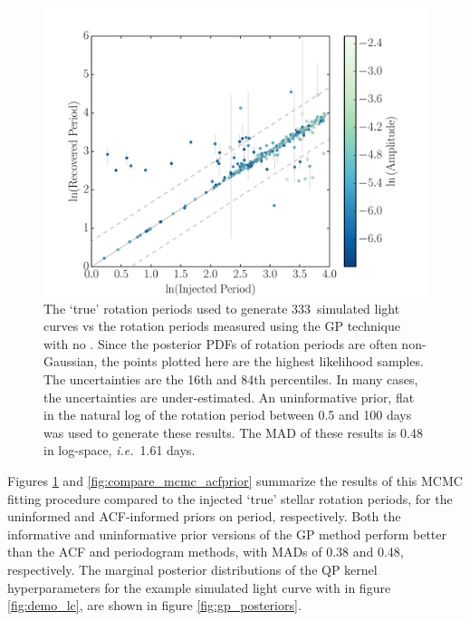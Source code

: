 \documentclass[useAMS, usenatbib, preprint, 12pt]{aastex}
\newcommand{\naigrain}{333}
\newcommand{\ie}{{\it i.e.}}
\begin{document}
\begin{figure}
\begin{center}
\includegraphics[width=6in, clip=true]{figures/comparison_noprior.pdf}
\caption{The `true' rotation periods used to generate \naigrain\
simulated light curves vs the rotation periods measured using the GP
technique with no .
Since the posterior PDFs of rotation periods are often non-Gaussian,
the points plotted here are the highest likelihood samples.
The uncertainties are the 16th and 84th percentiles.
In many cases, the uncertainties are under-estimated.
An uninformative prior, flat in the natural log of the rotation period between
    0.5 and 100 days was used to generate these results.
The MAD of these results is 0.48 in log-space, \ie\ 1.61 days.
    }
\label{fig:compare_mcmc_noprior}
\end{center}
\end{figure}

Figures \ref{fig:compare_mcmc_noprior} and \ref{fig:compare_mcmc_acfprior}
summarize the results of this MCMC fitting procedure compared to the injected
`true' stellar rotation periods, for the uninformed and ACF-informed priors on
period, respectively.
Both the informative and uninformative prior versions of the GP method perform
better than the ACF and periodogram methods, with MADs of 0.38 and 0.48,
respectively.
The marginal posterior distributions of the QP kernel hyperparameters for the
example simulated light curve with in figure \ref{fig:demo_lc}, are shown in
figure \ref{fig:gp_posteriors}.
\end{document}
